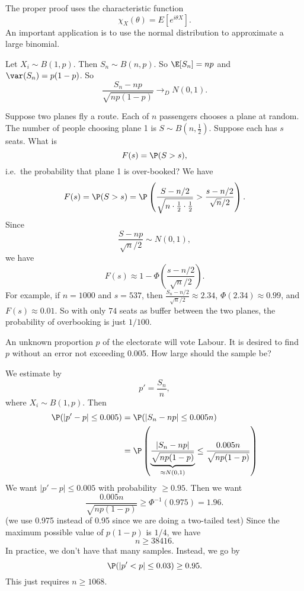 \documentclass[a4paper]{article}
\begin{document}
The proper proof uses the characteristic function
\[
  \chi_X(\theta) = E[e^{i\theta X}].
\]
An important application is to use the normal distribution to approximate a large binomial.

Let $X_i \sim B(1, p)$. Then $S_n \sim B(n, p)$. So $\E[S_n] = np$ and $\var (S_n) = p(1 - p)$. So
\[
  \frac{S_n - np}{\sqrt{np(1 - p)}} \to_D N(0, 1).
\]

\begin{eg}
  Suppose two planes fly a route. Each of $n$ passengers chooses a plane at random. The number of people choosing plane 1 is $S\sim B(n, \frac{1}{2})$. Suppose each has $s$ seats. What is
  \[
    F(s) = \P(S > s),
  \]
  i.e.\ the probability that plane 1 is over-booked? We have
  \[
    F(s) = \P(S > s) = \P\left(\frac{S - n/2}{\sqrt{n\cdot \frac{1}{2}\cdot \frac{1}{2}}} > \frac{s - n/2}{\sqrt{n}/2}\right).
  \]
  Since
  \[
    \frac{S - np}{\sqrt{n}/2}\sim N(0, 1),
  \]
  we have
  \[
    F(s) \approx 1 - \Phi\left(\frac{s - n/2}{\sqrt{n}/2}\right).
  \]
  For example, if $n = 1000$ and $s = 537$, then $\frac{S_n - n/2}{\sqrt{n}/2}\approx 2.34$, $\Phi(2.34)\approx 0.99$, and $F(s) \approx 0.01$. So with only $74$ seats as buffer between the two planes, the probability of overbooking is just $1/100$.
\end{eg}

\begin{eg}
  An unknown proportion $p$ of the electorate will vote Labour. It is desired to find $p$ without an error not exceeding $0.005$. How large should the sample be?

  We estimate by
  \[
    p' = \frac{S_n}{n},
  \]
  where $X_i\sim B(1, p)$. Then
  \begin{align*}
    \P(|p' - p| \leq 0.005) &= \P(|S_n - np| \leq 0.005n)\\
    &= \P\left(\underbrace{\frac{|S_n - np|}{\sqrt{np(1 - p)}}}_{\approx N(0, 1)} \leq \frac{0.005n}{\sqrt{np(1 - p)}}\right)
  \end{align*}
  We want $|p' - p| \leq 0.005$ with probability $\geq 0.95$. Then we want
  \[
    \frac{0.005n}{\sqrt{np(1 - p)}} \geq \Phi^{-1}(0.975) = 1.96.
  \]
  (we use 0.975 instead of 0.95 since we are doing a two-tailed test) Since the maximum possible value of $p(1 - p)$ is $1/4$, we have
  \[
    n \geq 38416.
  \]
  In practice, we don't have that many samples. Instead, we go by
  \[
    \P(|p' < p| \leq 0.03) \geq 0.95.
  \]
  This just requires $n \geq 1068$.
\end{eg}
\end{document}
